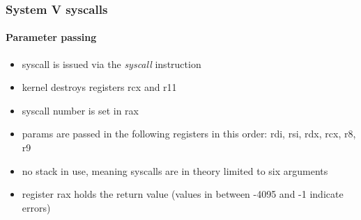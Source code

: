 \clearpage

\subsubsection{System V syscalls}

\paragraph{Parameter passing}

\begin{itemize}
\item syscall is issued via the {\em syscall} instruction
\item kernel destroys registers rcx and r11
\item syscall number is set in rax
\item params are passed in the following registers in this order: rdi, rsi, rdx, rcx, r8, r9
\item no stack in use, meaning syscalls are in theory limited to six arguments
\item register rax holds the return value (values in between -4095 and -1 indicate errors)
\end{itemize}

